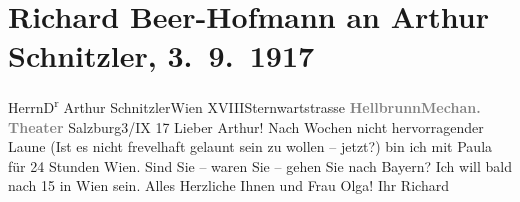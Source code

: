 

         
         \renewcommand{\erwaehntePersonen}{Personen: Paula Beer-Hofmann, Olga Schnitzler}
         \renewcommand{\erwaehnteOrte}{Orte: Bayern, Hellbrunn, Salzburg, Sternwartestraße, Wien, XVIII., Währing}
         \renewcommand{\erwaehnteWerke}{}
               \section[Richard Beer-Hofmann an Arthur Schnitzler, 3. 9. 1917]{ Richard Beer-Hofmann an Arthur Schnitzler, 3. 9. 1917}\nopagebreak{}\rehead{ }\begin{ledgroupsized}[t]{13cm}\normalsize\beginnumbering \toendnotes[C]{\smallbreak\pagebreak[2]} 
\pstart{}{\pb}Herrn\pend{}\pstart{}D\textsuperscript{r} Arthur Schnitzler\pend{}\pstart{}Wien XVIII\pend{}\pstart{}Sternwartstrasse\pend{}{\bigskip}\pstart
           \noindent{}\centering{}{\pb}\textcolor{gray}{\textbf{Hellbrunn\hspace*{1.5em}Mechan. Theater}}\pend
           \pstart
           \raggedleft{}{\pb}Salzburg3/IX 17\pend
           \pstart
           Lieber Arthur! Nach Wochen nicht hervorragender Laune (Ist es nicht
               frevelhaft gelaunt sein zu wollen – jetzt?) bin ich mit Paula für 24 Stunden Wien. Sind
               Sie – waren Sie – gehen Sie nach Bayern? Ich will
               bald nach 15 in Wien sein. Alles
               Herzliche Ihnen und Frau Olga! Ihr
                  \spacefill\mbox{Richard}\pend
           
         
         \endnumbering{}\end{ledgroupsized}  \newcommand{\dateiname}{L02272}\newcommand{\titel}{Richard Beer-Hofmann an Arthur Schnitzler, 3. 9. 1917}\newcommand{\editorInnen}{Martin Anton Müller und Gerd-Hermann Susen}
      